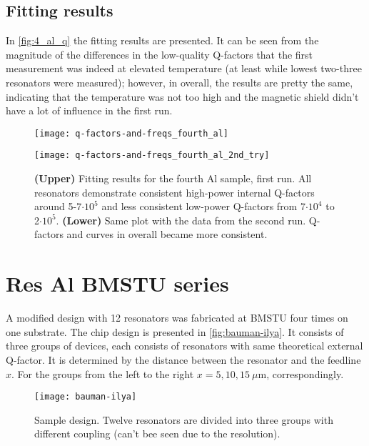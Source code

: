 \documentclass[12pt]{article}
\numberwithin{equation}{section}
\numberwithin{figure}{section}
\begin{document}
\subsection{Fitting results}

In \autoref{fig:4_al_q} the fitting results are presented. It can be seen from the magnitude of the differences in the low-quality Q-factors that the first measurement was indeed at elevated temperature (at least while lowest two-three resonators were measured); however, in overall, the results are pretty the same, indicating that the temperature was not too high and the magnetic shield didn't have a lot of influence in the first run.

\begin{figure}[h!]
\centering
\texttt{[image: q-factors-and-freqs\_fourth\_al]}

\vspace{0.5cm}
\texttt{[image: q-factors-and-freqs\_fourth\_al\_2nd\_try]}

\caption{\textbf{(Upper)} Fitting results for the fourth Al sample, first run. All resonators demonstrate consistent high-power internal Q-factors around 5-7$\cdot 10^5$ and less consistent low-power Q-factors from 7$\cdot 10^4$ to 2$\cdot 10^5$. \textbf{(Lower)} Same plot with the data from the second run. Q-factors and curves in overall became more consistent.}
\label{fig:4_al_q}
\end{figure}

\newpage
\section{Res Al BMSTU series}

A modified design with 12 resonators was fabricated at BMSTU four times on one substrate. The chip design is presented in \autoref{fig:bauman-ilya}. It consists of three groups of devices, each consists of resonators with same theoretical external Q-factor. It is determined by the distance between the resonator and the feedline $x$. For the groups from the left to the right $x = 5, 10, 15\ \mu$m, correspondingly.

\begin{figure}[h]
\centering
\texttt{[image: bauman-ilya]}
\caption{Sample design. Twelve resonators are divided into three groups with different coupling (can't bee seen due to the resolution).}
\label{fig:bauman-ilya}
\end{figure}
\end{document}
